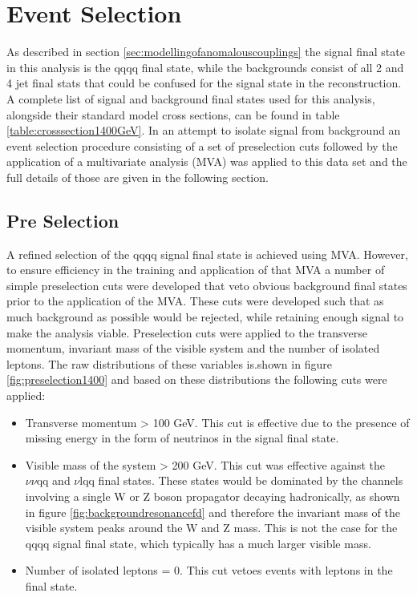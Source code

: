 \section{Event Selection}
\label{sec:eventselection}
As described in section \ref{sec:modellingofanomalouscouplings} the signal final state in this analysis is the \nu{\nu}qqqq final state, while the backgrounds consist of all 2 and 4 jet final stats that could be confused for the signal state in the reconstruction.  A complete list of signal and background final states used for this analysis, alongside their standard model cross sections, can be found in table \ref{table:crosssection1400GeV}.  In an attempt to isolate signal from background an event selection procedure consisting of a set of preselection cuts followed by the application of a multivariate analysis (MVA) was applied to this data set and the full details of those are given in the following section.


\subsection{Pre Selection}
\label{sec:preselection1400GeV}
A refined selection of the \nu{\nu}qqqq signal final state is achieved using MVA.  However, to ensure efficiency in the training and application of that MVA a number of simple preselection cuts were developed that veto obvious background final states prior to the application of the MVA.  These cuts were developed such that as much background as possible would be rejected, while retaining enough signal to make the analysis viable.  Preselection cuts were applied to the transverse momentum, invariant mass of the visible system and the number of isolated leptons. The raw distributions of these variables is.shown in figure \ref{fig:preselection1400} and based on these distributions the following cuts were applied:

\begin{itemize}
\item Transverse momentum > 100 GeV. This cut is effective due to the presence of missing energy in the form of neutrinos in the signal final state.
\item Visible mass of the system > 200 GeV.  This cut was effective against the $\nu\nu\text{qq}$ and $\nu\text{lqq}$ final states.  These states would be dominated by the channels involving a single W or Z boson propagator decaying hadronically, as shown in figure \ref{fig:backgroundresonancefd} and therefore the invariant mass of the visible system peaks around the W and Z mass.  This is not the case for the \nu{\nu}qqqq signal final state, which typically has a much larger visible mass.
\item Number of isolated leptons = 0. This cut vetoes events with leptons in the final state.
\end{itemize}

